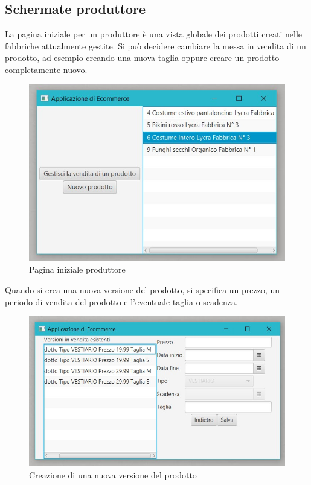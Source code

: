 \documentclass[a4paper,12pt]{report}
\begin{document}
\subsection*{Schermate produttore}
La pagina iniziale per un produttore è una vista globale dei prodotti creati nelle fabbriche attualmente gestite. 
Si può decidere cambiare la messa in vendita di un prodotto, ad esempio creando una nuova taglia oppure creare un prodotto completamente nuovo.
\begin{figure}[H]
	\centering{}
	\includegraphics[width=\textwidth]{img/Application/Producer1.jpg}
	\caption{Pagina iniziale produttore}
\end{figure}
Quando si crea una nuova versione del prodotto, si specifica un prezzo, un periodo di vendita del prodotto e l'eventuale taglia o scadenza.
\begin{figure}[H]
	\centering{}
	\includegraphics[width=\textwidth]{img/Application/Producer2.jpg}
	\caption{Creazione di una nuova versione del prodotto}
\end{figure}
\end{document}
